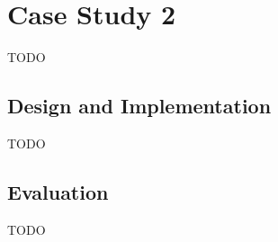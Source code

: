 \section{Case Study 2}

TODO

\subsection{Design and Implementation}

TODO

\subsection{Evaluation}

TODO